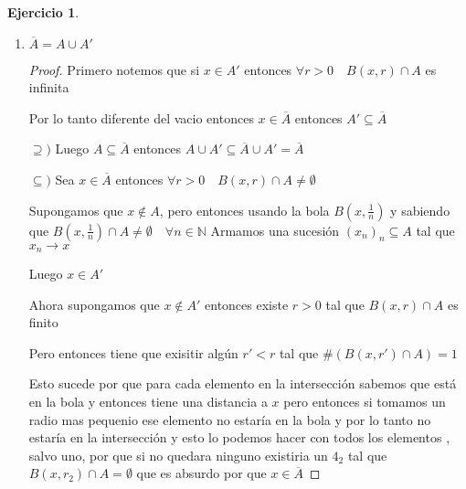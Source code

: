 \documentclass[12pt]{article}
\newcommand{\N}{\mathbb{N}}
\newcommand{\ra}{\rightarrow}
\newcommand{\ol}{\overline}
\theoremstyle{definition}
\newtheorem{ej}{Ejercicio}
\begin{document}
\begin{ej}
\begin{enumerate}
\begin{enumerate}
\begin{proof}
	    Entonces $x_{n} \in A$ o $x_{n} \in B$ para infinitos términos , si no tendría infinitos términos fuera de $A$ y fuera de $B$ lo que es absurdo. Quizas para los dos , pero no importa.

	    Spd $x_{n} \in A$ para infinitos términos entonces me quedo con todos los términos de $x_{n}$ tal que $x_{n} \in A$ esto es una subsucesión de $x_{n}$ entonces converge a $x$ por lo tanto tengo una sucesión contenida en $A$ que converge a $x$ luego $x \in A'$

	    Entonces $x \in A' \cup B'$
	    \newpage

	  $\supseteq )$ Sea $x \in A' \cup B'$ spd $x \in A'$ luego existe $(a_{n})_{n \in \N} \subseteq A$ tal que $a_{n} \ra a$

	  Pero entonces $(a_{n})_{n} \subseteq A \cup B$ por lo tanto $a \in (A \cup B)'$
	  \end{proof}
	\item $\ol A = A \cup A'$
	  \begin{proof}
	  Primero notemos que si $x \in A'$ entonces $\forall r > 0 \quad  B(x,r) \cap A$ es infinita 

	 Por lo tanto diferente del vacio entonces $x \in \ol A$ entonces $A' \subseteq \ol A$

	  $\supseteq ) $ Luego $A \subseteq \ol A$ entonces $A \cup A' \subseteq \ol A \cup A' = \ol A$

	$\subseteq )$ Sea $x \in \ol A$ entonces $\forall r>0 \quad  B(x,r) \cap A \neq \emptyset$

	Supongamos que $x \notin A$, pero entonces usando la bola $B(x,\frac{1}{n})$ y sabiendo que $B(x,\frac{1}{n}) \cap A \neq \emptyset \quad  \forall n \in \N$ Armamos una sucesión $(x_{n})_{n} \subseteq A$ tal que $x_{n} \ra x$

	Luego $x \in A'$

	Ahora supongamos que $x \notin A'$ entonces existe $r>0$ tal que $B(x,r) \cap A$ es finito

      Pero entonces tiene que exisitir algún $r'<r$ tal que $\# (B(x,r') \cap A )= 1$

      Esto sucede por que para cada elemento en la intersección sabemos que está en la bola y entonces tiene una distancia a $x$ pero entonces si tomamos un radio mas pequenio ese elemento no estaría en la bola y por lo tanto no estaría en la intersección y esto lo podemos hacer con todos los elementos , salvo uno, por que si no quedara ninguno existiria un $4_{2}$ tal que $B(x,r_{2}) \cap A = \emptyset$ que es absurdo por que $x \in \ol A$


\end{proof}
\end{enumerate}
\end{enumerate}
\end{ej}
\end{document}
